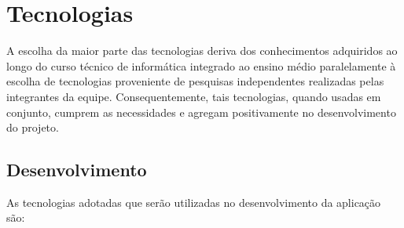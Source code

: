 \chapter{Tecnologias}
A escolha da maior parte das tecnologias deriva dos conhecimentos adquiridos ao longo do curso técnico de informática integrado ao ensino médio paralelamente à escolha de tecnologias proveniente de pesquisas independentes realizadas pelas integrantes da equipe. Consequentemente, tais tecnologias, quando usadas em conjunto, cumprem as necessidades e agregam positivamente no desenvolvimento do projeto. 

\section{Desenvolvimento}
As tecnologias adotadas que serão utilizadas no desenvolvimento da aplicação são:
